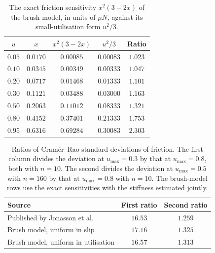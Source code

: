 \begin{table}[htbp]
\centering\small
\caption{The exact friction sensitivity $x^2(3-2x)$ of the brush model, in units of $\mu N$, against its small-utilisation form $u^2/3$.}\label{tab:app-sens}
\begin{tabular}{ccccc}
\toprule
$u$ & $x$ & $x^2(3-2x)$ & $u^2/3$ & Ratio\\
\midrule
$0.05$ & $0.0170$ & $0.00085$ & $0.00083$ & $1.023$\\
$0.10$ & $0.0345$ & $0.00349$ & $0.00333$ & $1.047$\\
$0.20$ & $0.0717$ & $0.01468$ & $0.01333$ & $1.101$\\
$0.30$ & $0.1121$ & $0.03488$ & $0.03000$ & $1.163$\\
$0.50$ & $0.2063$ & $0.11012$ & $0.08333$ & $1.321$\\
$0.80$ & $0.4152$ & $0.37401$ & $0.21333$ & $1.753$\\
$0.95$ & $0.6316$ & $0.69284$ & $0.30083$ & $2.303$\\
\bottomrule
\end{tabular}
\end{table}

\begin{table}[htbp]
\centering\small
\caption{Ratios of Cram\'er--Rao standard deviations of friction. The first column divides the deviation at $u_{\max}=0.3$ by that at $u_{\max}=0.8$, both with $n=10$. The second divides the deviation at $u_{\max}=0.5$ with $n=160$ by that at $u_{\max}=0.8$ with $n=10$. The brush-model rows use the exact sensitivities with the stiffness estimated jointly.}\label{tab:app-volvo}
\begin{tabular}{lcc}
\toprule
Source & First ratio & Second ratio\\
\midrule
Published by Jonasson et al. & $16.53$ & $1.259$\\
Brush model, uniform in slip & $17.16$ & $1.325$\\
Brush model, uniform in utilisation & $16.57$ & $1.313$\\
\bottomrule
\end{tabular}
\end{table}
